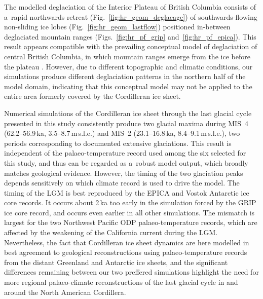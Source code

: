 \documentclass[tc, manuscript]{copernicus}
\begin{document}
      The modelled deglaciation of the Interior Plateau of British Columbia
      consists of a~rapid northwards retreat
      (Fig.~\ref{fig:hr_geom_deglacage}) of southwards-flowing non-sliding
      ice lobes (Fig.~\ref{fig:hr_geom_lastflow}) positioned in-between
      deglaciated mountain ranges (Figs.~\ref{fig:hr_pf_grip}
      and~\ref{fig:hr_pf_epica}). This result appears compatible with the
      prevailing conceptual model of deglaciation of central British
      Columbia, in which mountain ranges emerge from the ice before the
      plateau \citep[Fig.~7]{Fulton.1991}. However, due to different
      topographic and climatic conditions, our simulations produce different
      deglaciation patterns in the northern half of the model domain,
      indicating that this conceptual model may not be applied to the entire
      area formerly covered by the Cordilleran ice sheet.


\conclusions
\label{sec:concl}

      Numerical simulations of the Cordilleran ice sheet through the last
      glacial cycle presented in this study consistently produce two glacial
      maxima during MIS~4 (62.2--56.9\,\unit{ka},
      3.5--8.7\,\unit{m}\,s.l.e.) and MIS~2 (23.1--16.8\,\unit{ka},
      8.4--9.1\,\unit{m}\,s.l.e.), two periods corresponding to documented
      extensive glaciations. This result is independent of the
      palaeo-temperature record used among the six selected for this study,
      and thus can be regarded as a~robust model output, which broadly
      matches geological evidence. However, the timing of the two glaciation
      peaks depends sensitively on which climate record is used to drive the
      model. The timing of the LGM is best reproduced by the EPICA and
      Vostok Antarctic ice core records. It occurs about 2\,\unit{ka} too
      early in the simulation forced by the GRIP ice core record, and occurs
      even earlier in all other simulations. The mismatch is largest for the
      two Northwest Pacific ODP palaeo-temperature records, which are
      affected by the weakening of the California current during the LGM.
      Nevertheless, the fact that Cordilleran ice sheet dynamics are here
      modelled in best agreement to geological reconstructions using
      palaeo-temperature records from the distant Greenland and Antarctic
      ice sheets, and the significant differences remaining between our two
      preffered simulations highlight the need for more regional
      palaeo-climate reconstructions of the last glacial cycle in and around
      the North American Cordillera.
\end{document}
